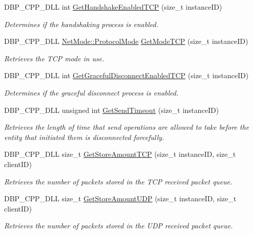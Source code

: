 \begin{DoxyCompactItemize}
DBP\_\-CPP\_\-DLL int \hyperlink{namespacemn_a42c695fef33766c040ec92ee2101c4d2}{GetHandshakeEnabledTCP} (size\_\-t instanceID)
\begin{DoxyCompactList}\small\item\em Determines if the handshaking process is enabled. \item\end{DoxyCompactList}\item 
DBP\_\-CPP\_\-DLL \hyperlink{class_net_mode_a43cfa55ee6a4db66a8d7d6c27f766964}{NetMode::ProtocolMode} \hyperlink{namespacemn_a7f8b463f4a6a05a984fde1e5aea119e7}{GetModeTCP} (size\_\-t instanceID)
\begin{DoxyCompactList}\small\item\em Retrieves the TCP mode in use. \item\end{DoxyCompactList}\item 
DBP\_\-CPP\_\-DLL int \hyperlink{namespacemn_a9d06820302a364d7a75c5442268de3b8}{GetGracefulDisconnectEnabledTCP} (size\_\-t instanceID)
\begin{DoxyCompactList}\small\item\em Determines if the graceful disconnect process is enabled. \item\end{DoxyCompactList}\item 
DBP\_\-CPP\_\-DLL unsigned int \hyperlink{namespacemn_a17dff75b4f61b5e954752b6f64b0cd64}{GetSendTimeout} (size\_\-t instanceID)
\begin{DoxyCompactList}\small\item\em Retrieves the length of time that send operations are allowed to take before the entity that initiated them is disconnected forcefully. \item\end{DoxyCompactList}\item 
DBP\_\-CPP\_\-DLL size\_\-t \hyperlink{namespacemn_ae2db35a7c9ec4e2e1fc7abe98749c130}{GetStoreAmountTCP} (size\_\-t instanceID, size\_\-t clientID)
\begin{DoxyCompactList}\small\item\em Retrieves the number of packets stored in the TCP received packet queue. \item\end{DoxyCompactList}\item 
DBP\_\-CPP\_\-DLL size\_\-t \hyperlink{namespacemn_a8d54cf87355792acd2b5b9d2ffb4120b}{GetStoreAmountUDP} (size\_\-t instanceID, size\_\-t clientID)
\begin{DoxyCompactList}\small\item\em Retrieves the number of packets stored in the UDP received packet queue. \item\end{DoxyCompactList}\item 

\end{DoxyCompactItemize}
